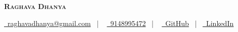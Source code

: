 \documentclass[10pt]{article}
\renewcommand{\textbf}[1]{{\bfseries\color{accent_darkest}#1}}
\begin{document}
\thispagestyle{empty}


\begin{center}
 \textbf{\textsc{\color{anotherred}\Huge Raghava Dhanya}}\\[10pt] %
\end{center}

\begin{center}
 \href{mailto:raghavadhanya@gmail.com}{\faEnvelope\ raghavadhanya@gmail.com}
 \ | \ %
 \href{tel:9148995472}{\faPhoneSquare\ 9148995472} \ | \ %
 \href{https://github.com/RaghavaDhanya}{ \underline{\faGithubSquare\
 GitHub}} \ | \ \href{https://in.linkedin.com/in/raghavadhanya}{\underline
 {\faLinkedinSquare\ LinkedIn}} 
\end{center}


\end{document}
